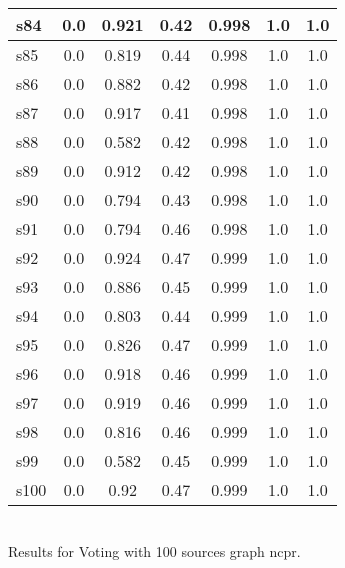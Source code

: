 \documentclass{article}
\begin{document}
\begin{tabular}{|l|c|c|c|c|c|c|}
\hline
s84 &0.0 & 0.921 & 0.42 & 0.998 & 1.0 & 1.0\\
\hline
s85 &0.0 & 0.819 & 0.44 & 0.998 & 1.0 & 1.0\\
\hline
s86 &0.0 & 0.882 & 0.42 & 0.998 & 1.0 & 1.0\\
\hline
s87 &0.0 & 0.917 & 0.41 & 0.998 & 1.0 & 1.0\\
\hline
s88 &0.0 & 0.582 & 0.42 & 0.998 & 1.0 & 1.0\\
\hline
s89 &0.0 & 0.912 & 0.42 & 0.998 & 1.0 & 1.0\\
\hline
s90 &0.0 & 0.794 & 0.43 & 0.998 & 1.0 & 1.0\\
\hline
s91 &0.0 & 0.794 & 0.46 & 0.998 & 1.0 & 1.0\\
\hline
s92 &0.0 & 0.924 & 0.47 & 0.999 & 1.0 & 1.0\\
\hline
s93 &0.0 & 0.886 & 0.45 & 0.999 & 1.0 & 1.0\\
\hline
s94 &0.0 & 0.803 & 0.44 & 0.999 & 1.0 & 1.0\\
\hline
s95 &0.0 & 0.826 & 0.47 & 0.999 & 1.0 & 1.0\\
\hline
s96 &0.0 & 0.918 & 0.46 & 0.999 & 1.0 & 1.0\\
\hline
s97 &0.0 & 0.919 & 0.46 & 0.999 & 1.0 & 1.0\\
\hline
s98 &0.0 & 0.816 & 0.46 & 0.999 & 1.0 & 1.0\\
\hline
s99 &0.0 & 0.582 & 0.45 & 0.999 & 1.0 & 1.0\\
\hline
s100 &0.0 & 0.92 & 0.47 & 0.999 & 1.0 & 1.0\\
\hline
\end{tabular}\\

\noindent Results for Voting with 100 sources graph ncpr.
\end{document}
